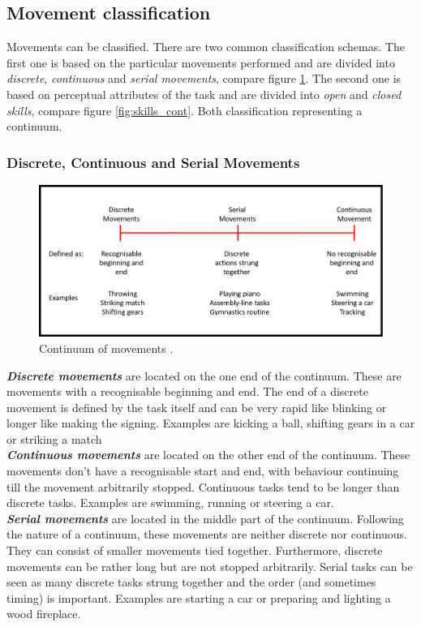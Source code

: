 \subsection{Movement classification}
Movements can be classified. There are two common classification schemas. The first one is based on the particular movements performed and are divided into \textit{discrete}, \textit{continuous} and \textit{serial movements}, compare figure \ref{fig:movements_cont}. The second one is based on perceptual attributes of the task and are divided into \textit{open} and \textit{closed skills}, compare figure \ref{fig:skills_cont}. Both classification representing a continuum.

\subsubsection{Discrete, Continuous and Serial Movements}
\begin{figure}
	\centering
	\includegraphics[width=1.0\textwidth]{img/movement_classification.png}
	\caption{Continuum of movements \cite{Schmidt2011}.}
	\label{fig:movements_cont}
\end{figure}
\textit{\textbf{Discrete movements}} are located on the one end of the continuum. These are movements with a recognisable beginning and end. The end of a discrete movement is defined by the task itself and can be very rapid like blinking or longer like making the signing. Examples are kicking a ball, shifting gears in a car or striking a match\\
\textit{\textbf{Continuous movements}} are located on the other end of the continuum. These movements don't have a recognisable start and end, with behaviour continuing till the movement arbitrarily stopped. Continuous tasks tend to be longer than discrete tasks. Examples are swimming, running or steering a car.\\
\textit{\textbf{Serial movements}} are located in the middle part of the continuum. Following the nature of a continuum, these movements are neither discrete nor continuous. They can consist of smaller movements tied together. Furthermore, discrete movements can be rather long but are not stopped arbitrarily. Serial tasks can be seen as many discrete tasks strung together and the order (and sometimes timing) is important. Examples are starting a car or preparing and lighting a wood fireplace.\\
